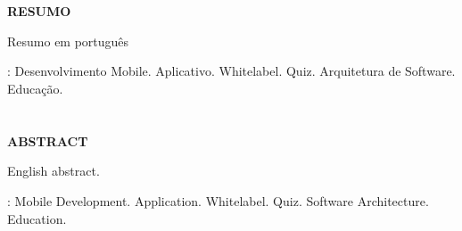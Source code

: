 \chapter*{}
\vspace{-4cm}
\begin{center}
 \textbf{RESUMO}
\end{center}
\vspace{0.5cm}
\noindent
Resumo em português

\vspace{1cm}

: Desenvolvimento Mobile. Aplicativo. Whitelabel. Quiz. Arquitetura de Software. Educação. 


\chapter*{}
\vspace{-4cm}
\begin{center}
 \textbf{ABSTRACT}
\end{center}
\vspace{0.5cm}
\noindent
English abstract.
\vspace{1cm}

: Mobile Development. Application. Whitelabel. Quiz. Software Architecture. Education.


